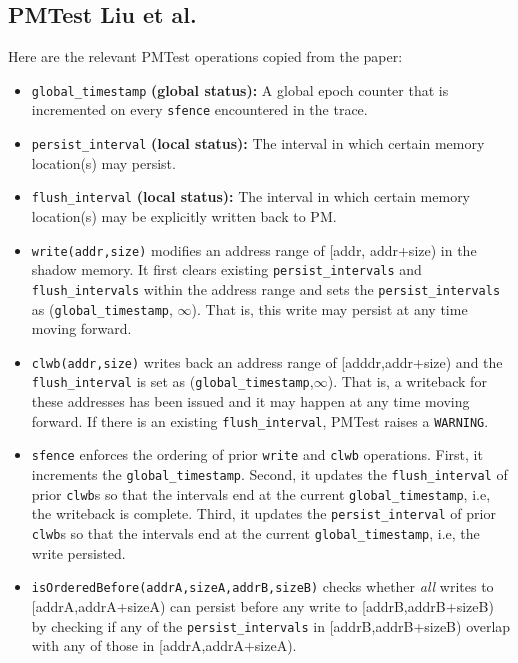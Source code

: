 \documentclass[11pt]{article}
\begin{document}
\subsection{PMTest Liu et al.}
Here are the relevant PMTest operations copied from the paper:
\begin{itemize}
    \item \texttt{global_timestamp} \textbf{(global status):} A global epoch counter that is incremented on every \texttt{sfence} encountered in the trace.
    \item \texttt{persist_interval} \textbf{(local status):} The interval in which certain memory location(s) may persist.
    \item \texttt{flush_interval} \textbf{(local status):} The interval in which certain memory location(s) may be explicitly written back to PM.
    \item \texttt{write(addr,size)} modifies an address range of [addr, addr+size) in the shadow memory. It first clears existing \texttt{persist_intervals} and \texttt{flush_intervals} within the address range and sets the \texttt{persist_intervals} as (\texttt{global_timestamp}, \(\infty\)). That is, this write may persist at any time moving forward.
    \item \texttt{clwb(addr,size)} writes back an address range of [adddr,addr+size) and the \texttt{flush_interval} is set as (\texttt{global_timestamp},\(\infty\)). That is, a writeback for these addresses has been issued and it may happen at any time moving forward. If there is an existing \texttt{flush_interval}, PMTest raises a \texttt{WARNING}.
    \item \texttt{sfence} enforces the ordering of prior \texttt{write} and \texttt{clwb} operations. First, it increments the \texttt{global_timestamp}. Second, it updates the \texttt{flush_interval} of prior \texttt{clwb}s so that the intervals end at the current \texttt{global_timestamp}, i.e, the writeback is complete. Third, it updates the \texttt{persist_interval} of prior \texttt{clwb}s so that the intervals end at the current \texttt{global_timestamp}, i.e, the write persisted.
    \item \texttt{isOrderedBefore(addrA,sizeA,addrB,sizeB)} checks whether \textit{all} writes to [addrA,addrA+sizeA) can persist before any write to [addrB,addrB+sizeB) by checking if any of the \texttt{persist_intervals} in [addrB,addrB+sizeB) overlap with any of those in [addrA,addrA+sizeA).
\end{itemize}
\end{document}
